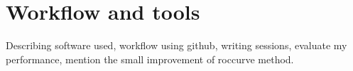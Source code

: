 \chapter{Workflow and tools}\label{chp:tools}
Describing software used, workflow using github, writing sessions, evaluate my performance, mention the small improvement of roccurve method.
